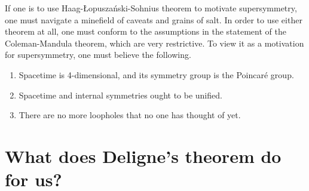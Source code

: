 \documentclass[a4paper]{report}
\theoremstyle{definition}
\theoremstyle{plain}
\theoremstyle{remark}
\begin{document}
If one is to use Haag-{\L}opusza{\'n}ski-Sohnius theorem to motivate supersymmetry, one must navigate a minefield of caveats and grains of salt. In order to use either theorem at all, one must conform to the assumptions in the statement of the Coleman-Mandula theorem, which are very restrictive. To view it as a motivation for supersymmetry, one must believe the following.
\begin{enumerate}
  \item Spacetime is 4-dimensional, and its symmetry group is the Poincar{\'e} group.

  \item Spacetime and internal symmetries ought to be unified.

  \item There are no more loopholes that no one has thought of yet.
\end{enumerate}

\section{What does Deligne's theorem do for us?}
\end{document}
